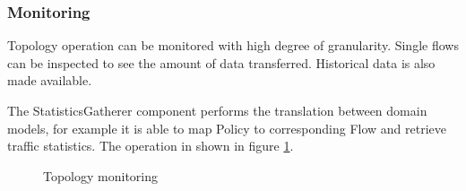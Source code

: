 \documentclass[11pt]{book}
\begin{document}
        \subsubsection{Monitoring}

          Topology operation can be monitored with high degree of granularity. Single flows can be inspected to see the
          amount of data transferred. Historical data is also made available.

          The StatisticsGatherer component performs the translation between domain models, for example it is able to map
          Policy to corresponding Flow and retrieve traffic statistics. The operation in shown in figure
          \ref{fig:arch:seqmon}.

          \begin{figure}[H]
            \centering





            \caption{Topology monitoring}
            \label{fig:arch:seqmon}
          \end{figure}
\end{document}

